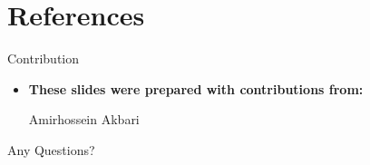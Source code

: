 \documentclass[serif, aspectratio=169]{beamer}
\begin{document}

\section{References}

\begin{frame}{Contribution}
    \begin{itemize}
        \item \textbf{These slides were prepared with contributions from:}
        \begin{outline}
            \1 Amirhossein Akbari
        \end{outline}
    \end{itemize}
\end{frame}


\begin{frame}
    \begin{center}
        {\Huge Any Questions?}
    \end{center}
\end{frame}
\end{document}
